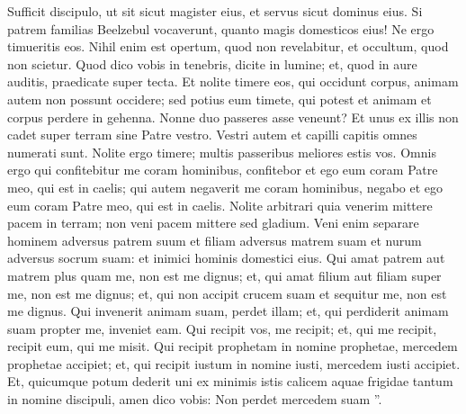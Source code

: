 \begin{biblechapter}
\begin{biblechapter}
\begin{biblechapter}
\begin{biblechapter}
\begin{biblechapter}
\begin{biblechapter}
\begin{biblechapter}
\begin{biblechapter}
\begin{biblechapter}
\begin{biblechapter}
\verse Sufficit discipulo, ut sit sicut magister eius, et servus sicut dominus eius. Si patrem familias Beelzebul vocaverunt, quanto magis domesticos eius!
 \verse Ne ergo timueritis eos. Nihil enim est opertum, quod non revelabitur, et occultum, quod non scietur. 
\verse Quod dico vobis in tenebris, dicite in lumine; et, quod in aure auditis, praedicate super tecta. 
\verse Et nolite timere eos, qui occidunt corpus, animam autem non possunt occidere; sed potius eum timete, qui potest et animam et corpus perdere in gehenna. 
\verse Nonne duo passeres asse veneunt? Et unus ex illis non cadet super terram sine Patre vestro.
 \verse Vestri autem et capilli capitis omnes numerati sunt. 
\verse Nolite ergo timere; multis passeribus meliores estis vos.
 \verse Omnis ergo qui confitebitur me coram hominibus, confitebor et ego eum coram Patre meo, qui est in caelis; 
\verse qui autem negaverit me coram hominibus, negabo et ego eum coram Patre meo, qui est in caelis.
 \verse Nolite arbitrari quia venerim mittere pacem in terram; non veni pacem mittere sed gladium. 
\verse Veni enim separare
 hominem adversus patrem suum
 et filiam adversus matrem suam
 et nurum adversus socrum suam:
 \verse et inimici hominis domestici eius.
 \verse Qui amat patrem aut matrem plus quam me, non est me dignus; et, qui amat filium aut filiam super me, non est me dignus; 
\verse et, qui non accipit crucem suam et sequitur me, non est me dignus. 
\verse Qui invenerit animam suam, perdet illam; et, qui perdiderit animam suam propter me, inveniet eam.
 \verse Qui recipit vos, me recipit; et, qui me recipit, recipit eum, qui me misit. 
\verse Qui recipit prophetam in nomine prophetae, mercedem prophetae accipiet; et, qui recipit iustum in nomine iusti, mercedem iusti accipiet. 
\verse Et, quicumque potum dederit uni ex minimis istis calicem aquae frigidae tantum in nomine discipuli, amen dico vobis: Non perdet mercedem suam ”.
 

\end{biblechapter}
\end{biblechapter}
\end{biblechapter}
\end{biblechapter}
\end{biblechapter}
\end{biblechapter}
\end{biblechapter}
\end{biblechapter}
\end{biblechapter}
\end{biblechapter}
